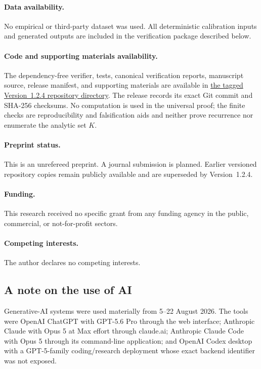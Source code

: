 \paragraph{Data availability.}
No empirical or third-party dataset was used.  All deterministic calibration
inputs and generated outputs are included in the verification package
described below.

\paragraph{Code and supporting materials availability.}
The dependency-free verifier, tests, canonical verification reports,
manuscript source, release manifest, and supporting materials are available in
\href{https://github.com/AlecKriebel/Math/tree/bimolecular-positive-recurrence-v1.2.4/bimolecular_positive_recurrence_submission_v1_2_4}{the tagged Version~1.2.4 repository directory}.
The release records its exact Git commit and SHA-256 checksums.  No computation
is used in the universal proof; the finite checks are reproducibility and
falsification aids and neither prove recurrence nor enumerate the analytic set
\(K\).

\paragraph{Preprint status.}
This is an unrefereed preprint.  A journal submission is planned.  Earlier
versioned repository copies remain publicly available and are superseded by
Version~1.2.4.

\paragraph{Funding.}
This research received no specific grant from any funding agency in the public,
commercial, or not-for-profit sectors.

\paragraph{Competing interests.}
The author declares no competing interests.

\subsection*{A note on the use of AI}
Generative-AI systems were used materially from 5--22 August 2026.  The tools
were OpenAI ChatGPT with GPT-5.6 Pro through the web interface; Anthropic
Claude with Opus 5 at Max effort through claude.ai; Anthropic Claude Code with
Opus 5 through its command-line application; and OpenAI Codex desktop with a
GPT-5-family coding/research deployment whose exact backend identifier was not
exposed.

